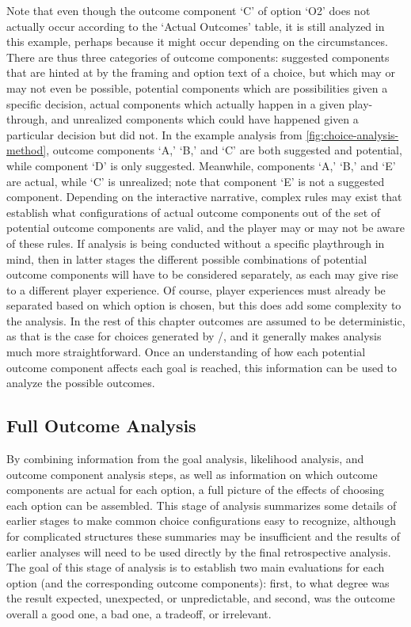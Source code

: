 Note that even though the outcome component `C' of option `O2' does not actually occur according to the `Actual Outcomes' table, it is still analyzed in this example, perhaps because it might occur depending on the circumstances.
%
There are thus three categories of outcome components: suggested components that are hinted at by the framing and option text of a choice, but which may or may not even be possible, potential components which are possibilities given a specific decision, actual components which actually happen in a given play-through, and unrealized components which could have happened given a particular decision but did not.
%
In the example analysis from \cref{fig:choice-analysis-method}, outcome components `A,' `B,' and `C' are both suggested and potential, while component `D' is only suggested.
%
Meanwhile, components `A,' `B,' and `E' are actual, while `C' is unrealized; note that component `E' is not a suggested component.
%
Depending on the interactive narrative, complex rules may exist that establish what configurations of actual outcome components out of the set of potential outcome components are valid, and the player may or may not be aware of these rules.
%
If analysis is being conducted without a specific playthrough in mind, then in latter stages the different possible combinations of potential outcome components will have to be considered separately, as each may give rise to a different player experience.
%
Of course, player experiences must already be separated based on which option is chosen, but this does add some complexity to the analysis.
%
In the rest of this chapter outcomes are assumed to be deterministic, as that is the case for choices generated by \dunyazad/, and it generally makes analysis much more straightforward.
%
Once an understanding of how each potential outcome component affects each goal is reached, this information can be used to analyze the possible outcomes.


\subsection{Full Outcome Analysis}

\label{sec:cp-full-outcome-analysis}

By combining information from the goal analysis, likelihood analysis, and outcome component analysis steps, as well as information on which outcome components are actual for each option, a full picture of the effects of choosing each option can be assembled.
%
This stage of analysis summarizes some details of earlier stages to make common choice configurations easy to recognize, although for complicated structures these summaries may be insufficient and the results of earlier analyses will need to be used directly by the final retrospective analysis.
%
The goal of this stage of analysis is to establish two main evaluations for each option (and the corresponding outcome components): first, to what degree was the result expected, unexpected, or unpredictable, and second, was the outcome overall a good one, a bad one, a tradeoff, or irrelevant.


